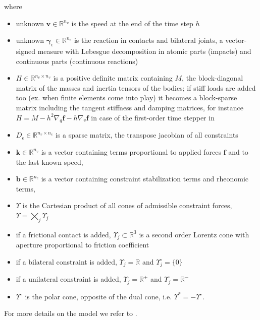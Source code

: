 \documentclass[final,3p]{elsarticle}
\newcommand{\vect}[1]{\bm{#1}}
\begin{document}
where 
\begin{itemize}
		\item unknown $\vect{v} \in \mathbb{R}^{n_v}$ is the speed at the end of the time step $h$
		\item unknown $\vect{\gamma}_\epsilon \in \mathbb{R}^{n_c}$ is the reaction in contacts and bilateral joints, a vector-signed measure with Lebesgue decomposition in atomic parts (impacts) and continuous parts (continuous reactions)
    \item $H \in \mathbb{R}^{n_v \times n_v}$ is a positive definite matrix containing $M$, 
		the block-diagonal matrix of the masses and inertia tensors of the bodies; if stiff
		loads are added too (ex. when finite elements come into play) it becomes a block-sparse matrix including the tangent stiffness and damping matrices,
		for instance $H=M-{h^2}\nabla_q\vect{f}-{h}\nabla_v\vect{f}$ in case of the first-order time stepper in \cite{TasoraAnitescuCMAME10}
    \item $D_\epsilon \in \mathbb{R}^{n_v \times n_c}$ is a sparse matrix, the transpose jacobian of all constraints
    \item $\vect{k} \in \mathbb{R}^{n_v}$ is a vector containing terms proportional to applied forces $\vect{f}$ and to the last known speed,
    \item $\vect{b} \in \mathbb{R}^{n_c}$ is a vector containing constraint stabilization terms and rheonomic terms,
    \item $\Upsilon$ is the Cartesian product of all cones of admissible constraint forces, $\Upsilon = \bigtimes_j \Upsilon_j$
    \item if a frictional contact is added, $\Upsilon_j \subset \mathbb{R}^3$ is a second order Lorentz cone with aperture proportional to friction coefficient
    \item if a bilateral constraint is added, $\Upsilon_j = \mathbb{R}$ and $\Upsilon^\circ_j = \{0\}$
    \item if a unilateral constraint is added, $\Upsilon_j = \mathbb{R}^+$ and $\Upsilon^\circ_j = \mathbb{R}^-$
    \item $\Upsilon^{\circ}$ is the polar cone, opposite of the dual cone, i.e. $\Upsilon^{*} = -\Upsilon^\circ$.
\end{itemize}

For more details on the model we refer to 
\cite{negrutSerbanTasoraJCND2017}. %
\end{document}
